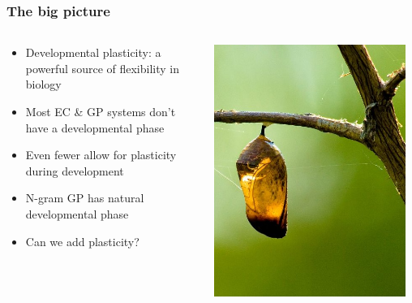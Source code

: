 \documentclass{beamer}
\begin{document}
\begin{frame}
  \frametitle{The big picture}
  
  \begin{columns}
  \begin{column}{0.6\textwidth}
  \begin{itemize}
  	\item Developmental plasticity: a powerful source of flexibility in biology
	\item Most EC \& GP systems don't have a developmental phase
	\item Even fewer allow for plasticity during development
	\item N-gram GP has natural developmental phase
	\item Can we add plasticity?
  \end{itemize}
  \end{column}
  \begin{column}{0.4\textwidth}
   \includegraphics[width=0.95\textwidth]{Illustrations/Empty_cocoon_crop_by_Bluedrakon_from_Flickr.jpg}
       \\
  \end{column}
  \end{columns}
\end{frame}
\end{document}

